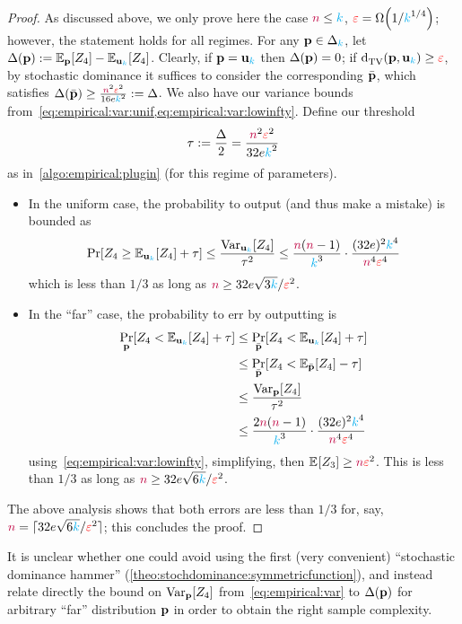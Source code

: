 \begin{proof}
As discussed above, we only prove here the case ${\textcolor{purple}{n}} \leq {\textcolor{cyan}{k}}$, \ie $\dst = \bigOmega{1/\ab^{1/4}}$; however, the statement holds for all regimes. 
For any $\mathbf{p}\in\Delta_{{\textcolor{cyan}{k}}}$, let $\Delta(\p) \eqdef \bE{\p}{Z_4} - \bE{\uniform_\ab}{Z_4}$. Clearly, if $\mathbf{p}=\mathbf{u}_{\textcolor{cyan}{k}}$ then $\Delta(\mathbf{p})=0$; if $\totalvardist{\p}{\uniform_\ab} \geq \dst$, by  stochastic dominance it suffices to consider the corresponding $\bar{\mathbf{p}}$, which satisfies $\Delta(\bar{\mathbf{p}})\geq \frac{{\textcolor{purple}{n}}^2\textcolor{red}{\varepsilon}^2}{16e{\textcolor{cyan}{k}}^2} := \Delta$. We also have our variance bounds from~\cref{eq:empirical:var:unif,eq:empirical:var:lowinfty}. Define our threshold
\[
    \tau := \frac{\Delta}{2} = \frac{{\textcolor{purple}{n}}^2\textcolor{red}{\varepsilon}^2}{32e{\textcolor{cyan}{k}}^2}
\]
as in~\cref{algo:empirical:plugin} (for this regime of parameters).
\begin{itemize}
    \item In the uniform case, the probability to output \reject (and thus make a mistake) is bounded as
    \[
    \bPr{Z_4 \geq \bE{\uniform_\ab}{Z_4} + \tau} \leq \frac{\Var_{\uniform_\ab}[Z_4]}{\tau^2}
    \leq \frac{\ns(\ns-1)}{\ab^3}\cdot \frac{(32e)^2\ab^4}{\ns^4\dst^4}
    \]
    which is less than $1/3$ as long as ${\textcolor{purple}{n}} \geq 32e\sqrt{3{\textcolor{cyan}{k}}}/\textcolor{red}{\varepsilon}^2$.
    \item In the ``far'' case, the probability to err by outputting \accept is
    \begin{align*}
        \bP{\p}{Z_4 < \bE{\uniform_\ab}{Z_4} + \tau} %
        &\leq \bP{\bar{\p}}{Z_4 < \bE{\uniform_\ab}{Z_4} + \tau} \\
        &\leq \bP{\bar{\p}}{Z_4 < \bE{\bar{\p}}{Z_4} - \tau} \\
        &\leq \frac{\Var_{\p}[Z_4]}{\tau^2} \\
        &\leq \frac{2\ns(\ns-1)}{\ab^3}\cdot \frac{(32e)^2\ab^4}{\ns^4\dst^4}
    \end{align*}
    using~\cref{eq:empirical:var:lowinfty}, simplifying, then $\bEE{Z_3}\geq \ns\dst^2$. This is less than $1/3$ as long as ${\textcolor{purple}{n}} \geq 32e\sqrt{6{\textcolor{cyan}{k}}}/\textcolor{red}{\varepsilon}^2$.
  \end{itemize}
  The above analysis shows that both errors are less than $1/3$ for, say, ${\textcolor{purple}{n}} = \lceil{32e\sqrt{6{\textcolor{cyan}{k}}}/\textcolor{red}{\ensuremath{\varepsilon}}^2}\rceil$; this concludes the proof.
\end{proof}
\begin{remark}
It is unclear whether one could avoid using the first (very convenient) ``stochastic dominance hammer'' (\cref{theo:stochdominance:symmetricfunction}), and instead relate directly the bound on $\operatorname{Var}_{\mathbf{p}}[Z_4]$ from~\cref{eq:empirical:var} to $\Delta(\mathbf{p})$ for arbitrary ``far'' distribution $\mathbf{p}$ in order to obtain the right sample complexity.
\end{remark}

